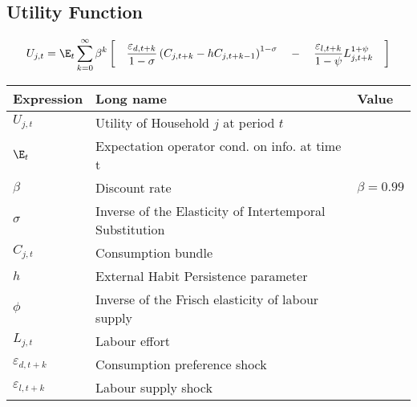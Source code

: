 \subsection{Utility Function}
\begin{align}
    U_{j, t}  =\E_t \sum_{k=0}^{\infty} \beta^{k} \left[ \quad
    \frac{\varepsilon_{d, t+k}}{1-\sigma}\left(C_{j, t+k} -hC_{j,t+k-1} \right)^{1-\sigma} \quad - \quad \frac{\varepsilon_{l, t+k}}{1-\psi}L_{j, t+k}^{1+\psi} \quad
    \right]
\end{align}

\begin{tabularx}{\textwidth}{llX}
    \textbf{Expression}    & \textbf{Long name}                                      & \textbf{Value} \\ \hline \hline
    $U_{j,t}$              & Utility of Household $j$ at period  $t$                 &                \\
    $\E_t$                 & Expectation operator cond. on info. at time t           &                \\
    $\beta$                & Discount rate                                           & $\beta=0.99$   \\
    $\sigma$               & Inverse of the Elasticity of Intertemporal Substitution &                \\
    $C_{j,t}$              & Consumption bundle                                      &                \\
    $h$                    & External Habit Persistence parameter                    &                \\
    $\phi$                 & Inverse of the Frisch elasticity of labour supply       &                \\
    $L_{j,t}$              & Labour effort                                           &                \\
    $\varepsilon_{d, t+k}$ & Consumption preference shock                            &                \\
    $\varepsilon_{l, t+k}$ & Labour supply shock                                     &
\end{tabularx}

